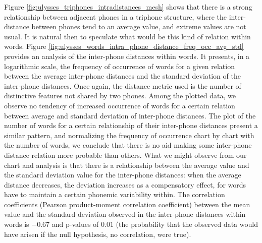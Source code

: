 Figure \ref{fig:ulysses_triphones_intradistances_mesh} shows that there is a strong relationship 
between adjacent phones in a triphone structure, where the inter-distance between phones tend to
an average value, and extreme values are not usual. It is natural then to speculate what would be
this kind of relation within words. Figure \ref{fig:ulysses_words_intra_phone_distance_freq_occ_avg_std}
provides an analysis of the inter-phone distances within words. It presents, in a logarithmic scale,
the frequency of occurrence of words for a given relation between the average inter-phone distances and 
the standard deviation of the inter-phone distances. Once again, the distance metric used is the number
of distinctive features not shared by two phones. Among the plotted data, we observe no tendency of increased
occurrence of words for a certain relation between average and standard deviation of inter-phone distances.
The plot of the number of words for a certain relationship of their inter-phone distances present a similar
pattern, and normalizing the frequency of occurrence chart by chart with the number of words, we
conclude that there is no aid making some inter-phone distance relation more probable than others.
What we might observe from our chart and analysis is that there is a relationship between the
average value and the standard deviation value for the inter-phone distances: when the average distance
decreases, the deviation increases as a compensatory effect, for words have to maintain a certain phonemic 
variability within. The correlation coefficients (Pearson product-moment correlation coefficient)
between the mean value and the standard deviation observed in the inter-phone distances within words
is $-0.67$ and p-values of $0.01$ (the probability that the observed data would have arisen if the
null hypothesis, no correlation, were true).


